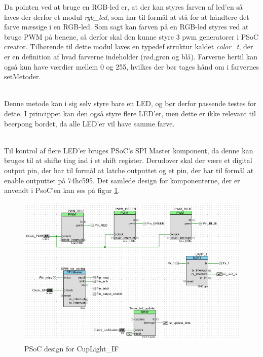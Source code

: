 \documentclass[Softwaredesign/Softwaredesign_main.tex]{subfiles}
\begin{document}
Da pointen ved at bruge en RGB-led er, at der kan styres farven af led'en så laves der derfor et modul \textit{rgb\_led}, som har til formål at stå for at håndtere det farve mæssige i en RGB-led. Som sagt kan farven på en RGB-led styres ved at bruge PWM på benene, så derfor skal den kunne styre 3 pwm generatorer i PSoC creator. Tilhørende til dette modul laves en typedef struktur kaldet \textit{color\_t}, der er en definition af hvad farverne indeholder (rød,grøn og blå). Farverne hertil kan også kun have værdier mellem 0 og 255, hvilkes der bør tages hånd om i farvernes setMetoder.

\\Denne metode kan i sig selv styre bare en LED, og bør derfor passende testes for dette. I princippet kan den også styre flere LED'er, men dette er ikke relevant til beerpong bordet, da alle LED'er vil have samme farve.

\\Til kontrol af flere LED'er bruges PSoC's SPI Master komponent, da denne kan bruges til at shifte ting ind i et shift register. Derudover skal der være et digital output pin, der har til formål at latche outputtet og et pin, der har til formål at enable outputtet på 74hc595. Det samlede design for komponenterne, der er anvendt i PsoC'en kan ses på figur \ref{fig:CupLight_PSoC_Design}.
\begin{figure}[H]
    \centering
    \includegraphics[width=\textwidth]{Softwaredesign/CupLight_IF/graphics/CupLightPSoCDesign.png}
    \caption{PSoC design for CupLight\_IF}
    \label{fig:CupLight_PSoC_Design}
\end{figure}
\end{document}
